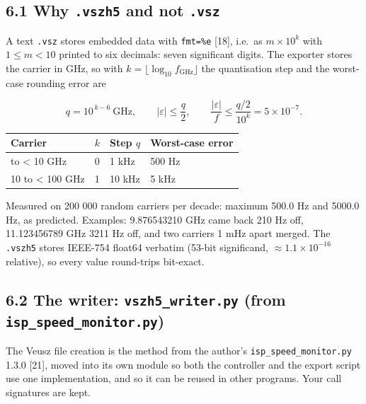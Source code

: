 \documentclass[
\directlua{luaotfload.add_fallback("qsfallback", {"DejaVu Sans:mode=harf;", "DejaVu Sans Mono:mode=harf;", "DejaVu Math TeX Gyre:mode=harf;"})}
  10pt,
  letterpaper,
]{article}
\begin{document}
\hypertarget{why-.vszh5-and-not-.vsz}{%
\subsection{\texorpdfstring{6.1 Why \texttt{.vszh5} and not
\texttt{.vsz}}{6.1 Why .vszh5 and not .vsz}}\label{why-.vszh5-and-not-.vsz}}

A text \texttt{.vsz} stores embedded data with
\texttt{fmt=\textquotesingle{}\%e\textquotesingle{}} {[}18{]}, i.e.~as
\(m \times 10^{k}\) with \(1 \le m < 10\) printed to six decimals: seven
significant digits. The exporter stores the carrier in GHz, so with
\(k = \lfloor \log_{10} f_{\mathrm{GHz}} \rfloor\) the quantisation step
and the worst-case rounding error are

\[q = 10^{\,k-6}\ \text{GHz}, \qquad |\varepsilon| \le \frac{q}{2},
\qquad \frac{|\varepsilon|}{f} \le \frac{q/2}{10^{k}} = 5\times10^{-7}.\]

\begin{longtable}[]{@{}llll@{}}
\toprule\noalign{}
Carrier & \(k\) & Step \(q\) & Worst-case error \\
\midrule\noalign{}
\endhead
\bottomrule\noalign{}
\endlastfoot
1 to \textless{} 10 GHz & 0 & 1 kHz & 500 Hz \\
10 to \textless{} 100 GHz & 1 & 10 kHz & 5 kHz \\
\end{longtable}

Measured on 200 000 random carriers per decade: maximum 500.0 Hz and
5000.0 Hz, as predicted. Examples: 9.876543210 GHz came back 210 Hz off,
11.123456789 GHz 3211 Hz off, and two carriers 1 mHz apart merged. The
\texttt{.vszh5} stores IEEE-754 float64 verbatim (53-bit significand,
\(\approx 1.1\times10^{-16}\) relative), so every value round-trips
bit-exact.

\hypertarget{the-writer-vszh5_writer.py-from-isp_speed_monitor.py}{%
\subsection{\texorpdfstring{6.2 The writer: \texttt{vszh5\_writer.py}
(from
\texttt{isp\_speed\_monitor.py})}{6.2 The writer: vszh5\_writer.py (from isp\_speed\_monitor.py)}}\label{the-writer-vszh5_writer.py-from-isp_speed_monitor.py}}

The Veusz file creation is the method from the author's
\texttt{isp\_speed\_monitor.py} 1.3.0 {[}21{]}, moved into its own
module so both the controller and the export script use one
implementation, and so it can be reused in other programs. Your call
signatures are kept.
\end{document}
